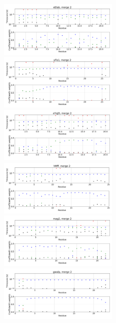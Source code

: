 \documentclass[12pt]{article}
\begin{document}
 


\begin{figure}
\centering
\includegraphics[width=0.5\textwidth]{eElab_2_slow.png}
\includegraphics[width=0.5\textwidth]{yFis1_2_slow.png}
\includegraphics[width=0.5\textwidth]{eYqjD_2_slow.png}
\includegraphics[width=0.5\textwidth]{hMff_2_slow.png}
\includegraphics[width=0.5\textwidth]{mag2_2_slow.png}
\includegraphics[width=0.5\textwidth]{gwalp_2_slow.png}
\end{figure}
\end{document}

